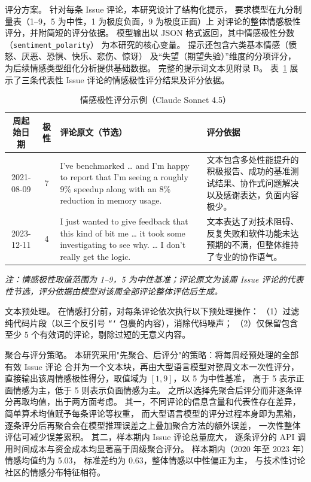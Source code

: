 \documentclass[
    type = master, %
    degree = professional,        %
    decl-page,  %
    twoside,                %
    fontset = fandol %
  ]{njuthesis}
\begin{document}
评分方案。
针对每条 Issue 评论，本研究设计了结构化提示，
要求模型在九分制量表（1--9，5 为中性，1 为极度负面，9 为极度正面）上
对评论的整体情感极性评分，并附简短的评分依据。
模型输出以 JSON 格式返回，其中情感极性分数（\texttt{sentiment\_polarity}）
为本研究的核心变量。
提示还包含六类基本情感（愤怒、厌恶、恐惧、快乐、悲伤、惊讶）
及“失望（期望失验）”维度的分项评分，
为后续情感类型细化分析提供基础数据。
完整的提示词文本见附录 B。
表~\ref{tab:sentiment-example} 展示了三条代表性 Issue 评论的情感极性评分结果及评分依据。

\begin{table}[htbp]
    \centering
    \caption{情感极性评分示例（Claude Sonnet 4.5）}
    \label{tab:sentiment-example}
    \small
    \begin{tabularx}{\textwidth}{c c >{\raggedright\arraybackslash}X >{\raggedright\arraybackslash}X}
        \toprule
        周起始日期 & 极性 & 评论原文（节选） & 评分依据 \\
        \midrule
        2021-08-09 & 7 &
        I've benchmarked \ldots{} and I'm happy to report that I'm seeing a roughly 9\% speedup along with an 8\% reduction in memory usage. &
        文本包含多处性能提升的积极报告、成功的基准测试结果、协作式问题解决以及感谢表达，负面内容极少。 \\
        \midrule
        2023-12-11 & 4 &
        I just wanted to give feedback that this kind of bit me \ldots{} it took some investigating to see why. \ldots{} I don't really get the logic. &
        文本表达了对技术阻碍、反复失败和软件功能未达预期的不满，但整体维持了专业的协作语气。 \\
        \bottomrule
    \end{tabularx}
    \par\vspace{4pt}
    {\small\textit{注：情感极性取值范围为 1--9，5 为中性基准；评论原文为该周 Issue 评论的代表性节选，评分依据由模型对该周全部评论整体评估后生成。}}
\end{table}

文本预处理。
在情感打分前，对每条评论依次执行以下预处理操作：
（1）过滤纯代码片段（以三个反引号 \texttt{```} 包裹的内容），消除代码噪声；
（2）仅保留包含至少 5 个有效词的评论，剔除过短的无意义内容。

聚合与评分策略。
本研究采用"先聚合、后评分"的策略：将每周经预处理的全部有效 Issue 评论
合并为一个文本块，再由大型语言模型对整周文本一次性评分，
直接输出该周情感极性得分，取值域为 $[1, 9]$，以 5 为中性基准，
高于 5 表示正面情感为主，低于 5 则表示负面情感为主。
之所以选择先聚合后评分而非逐条评分再取均值，出于两方面考虑。
其一，不同评论的信息含量和代表性存在差异，
简单算术均值赋予每条评论等权重，
而大型语言模型的评分过程本身即为黑箱，
逐条评分后再聚合会在模型推理误差之上叠加聚合方法的额外误差，
一次性整体评估可减少误差累积。
其二，样本期内 Issue 评论总量庞大，
逐条评分的 API 调用时间成本与资金成本均显著高于周级聚合评分。
样本期内（2020 年至 2023 年）情感均值约为 5.03，
标准差约为 0.63，整体情感以中性偏正为主，
与技术性讨论社区的情感分布特征相符。
\end{document}
